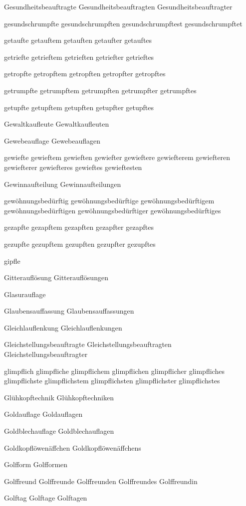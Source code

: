 Gesundheitsbeauftragte
Gesundheitsbeauftragten
Gesundheitsbeauftragter

gesundschrumpfte
gesundschrumpften
gesundschrumpftest
gesundschrumpftet

getaufte
getauftem
getauften
getaufter
getauftes

getriefte
getrieftem
getrieften
getriefter
getrieftes

getropfte
getropftem
getropften
getropfter
getropftes

getrumpfte
getrumpftem
getrumpften
getrumpfter
getrumpftes

getupfte
getupftem
getupften
getupfter
getupftes

Gewaltkaufleute
Gewaltkaufleuten

Gewebeauflage
Gewebeauflagen

gewiefte
gewieftem
gewieften
gewiefter
gewieftere
gewiefterem
gewiefteren
gewiefterer
gewiefteres
gewieftes
gewieftesten

Gewinnaufteilung
Gewinnaufteilungen

gewöhnungsbedürftig
gewöhnungsbedürftige
gewöhnungsbedürftigem
gewöhnungsbedürftigen
gewöhnungsbedürftiger
gewöhnungsbedürftiges

gezapfte
gezapftem
gezapften
gezapfter
gezapftes

gezupfte
gezupftem
gezupften
gezupfter
gezupftes

gipfle

Gitterauflösung
Gitterauflösungen

Glasurauflage

Glaubensauffassung
Glaubensauffassungen

Gleichlauflenkung
Gleichlauflenkungen

Gleichstellungsbeauftragte
Gleichstellungsbeauftragten
Gleichstellungsbeauftragter

glimpflich
glimpfliche
glimpflichem
glimpflichen
glimpflicher
glimpfliches
glimpflichste
glimpflichstem
glimpflichsten
glimpflichster
glimpflichstes

Glühkopftechnik
Glühkopftechniken

Goldauflage
Goldauflagen

Goldblechauflage
Goldblechauflagen

Goldkopflöwenäffchen
Goldkopflöwenäffchens

Golfform
Golfformen

Golffreund
Golffreunde
Golffreunden
Golffreundes
Golffreundin

Golftag
Golftage
Golftagen

